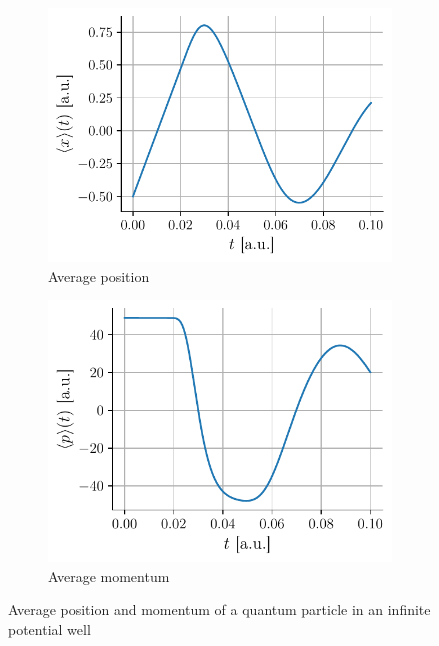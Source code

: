\begin{figure}[h]
    \centering
    \begin{subfigure}{0.48\linewidth}
        \centering
        \includegraphics[width=\linewidth]{figures/i_xmoy.pdf}
        \caption{Average position}
        \label{fig:i_xmoy}
    \end{subfigure}
    \begin{subfigure}{0.48\linewidth}
        \centering
        \includegraphics[width=\linewidth]{figures/i_pmoy.pdf}
        \caption{Average momentum}
        \label{fig:i_pmoy}
    \end{subfigure}
    \caption{Average position and momentum of a quantum particle in an infinite potential well}
    \label{fig:i_xmoy_pmoy}
\end{figure}

